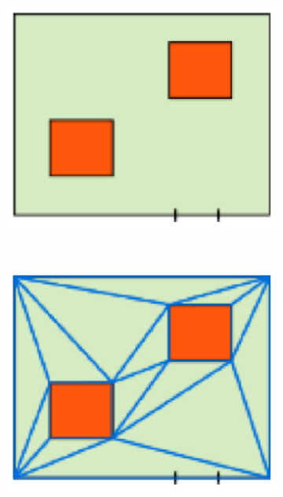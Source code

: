 \begin{figure}[!htbp]
 \centering
 \begin{subfigure}[b]{0.235\textwidth}
 \includegraphics[width=\textwidth]{images/graph-generation/single/graph-generation-1}
 \caption{}
 \label{fig:graph-generation-a}
 \end{subfigure}
 ~
 \begin{subfigure}[b]{0.235\textwidth}
 \includegraphics[width=\textwidth]{images/graph-generation/single/graph-generation-2}
 \caption{}
 \label{fig:graph-generation-b}
 \end{subfigure}

\end{figure}
